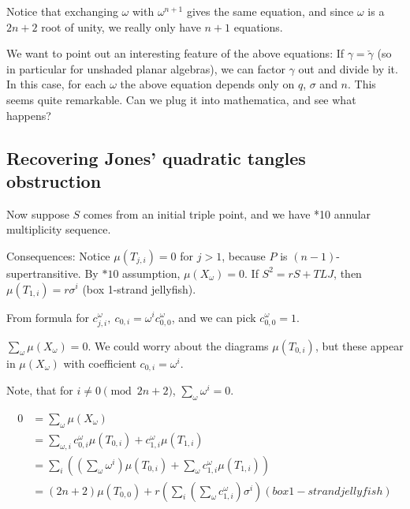 \documentclass[12pt]{article}
\begin{document}
Notice that exchanging $\omega$ with $\omega^{n+1}$ gives the same equation, and since $\omega$ is a $2n+2$ root of unity, we really only have $n+1$ equations.

 We want to point out an interesting feature of the above equations:  If $\gamma=\check{\gamma}$ (so in particular for unshaded planar algebras), we can factor $\gamma$ out and divide by it.  In this case, for each $\omega$ the above equation depends only on $q$, $\sigma$ and $n$.  This seems quite remarkable.  Can we plug it into mathematica, and see what happens?






\subsection{Recovering Jones' quadratic tangles obstruction}




Now suppose $S$ comes from an initial triple point, and we have *10 annular multiplicity sequence.

Consequences:
Notice $\mu(T_{j,i})=0$ for $j>1$, because $P$ is $(n-1)$-supertransitive. 
 By $*10$ assumption, $\mu(X_{\omega})=0$.
If $S^{2}= r S + TLJ$, then $\mu(T_{1,i})=r \sigma^{i}$ (box 1-strand jellyfish).

From formula for $c^{\omega}_{j,i},\ c_{0,i}=\omega^{i} c^{\omega}_{0,0}$, and we can pick $c^{\omega}_{0,0} = 1$.

$\sum_{\omega} \mu(X_{\omega})=0$.
We could worry about the diagrams $\mu(T_{0,i})$, but these appear in $\mu(X_{\omega})$ with coefficient $c_{0,i}=\omega^{i}$.


Note, that for $i \neq 0 \pmod{2n+2}$, $\sum_{\omega} \omega^{i}=0$.

\begin{align*}
0 & = \sum_{\omega} \mu(X_{\omega}) \\
   & = \sum_{\omega, i} c^{\omega}_{0,i} \mu(T_{0,i}) + c^{\omega}_{1,i} \mu(T_{1,i}) \\
   & = \sum_i \left( \left(\sum_\omega \omega^i\right) \mu(T_{0,i}) + \sum_\omega c^{\omega}_{1,i} \mu(T_{1,i})\right) \\
   & = (2n+2) \mu(T_{0,0}) + r \left(\sum_i \left(\sum_\omega c^{\omega}_{1,i}\right) \sigma^{i}\right) (box 1-strand jellyfish)
\end{align*}
\end{document}
